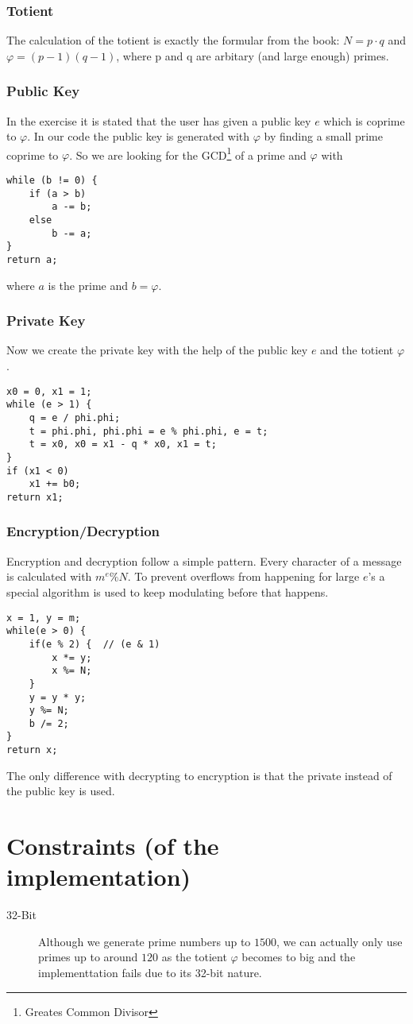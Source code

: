 \documentclass{report}
\begin{document}
\subsubsection{Totient}
The calculation of the totient is exactly the formular from the book: $N = p \cdot q$ and $\varphi = (p - 1)(q - 1)$, where p and q are arbitary (and large enough) primes.
\subsubsection{Public Key}
In the exercise it is stated that the user has given a public key $e$ which is coprime to $\varphi$. In our code the public key is generated with $\varphi$ by finding a small prime coprime to $\varphi$. So we are looking for the GCD\footnote{Greates Common Divisor} of a prime and $\varphi$ with
\begin{lstlisting}
while (b != 0) {
	if (a > b)
		a -= b;
	else
		b -= a;
}
return a;
\end{lstlisting}
where $a$ is the prime and $b=\varphi$.
\subsubsection{Private Key}
Now we create the private key with the help of the public key $e$ and the totient $\varphi$.
\begin{lstlisting}
x0 = 0, x1 = 1;
while (e > 1) {
	q = e / phi.phi;
	t = phi.phi, phi.phi = e % phi.phi, e = t;
	t = x0, x0 = x1 - q * x0, x1 = t;
}
if (x1 < 0)
	x1 += b0;
return x1;
\end{lstlisting}
\subsubsection{Encryption/Decryption}
Encryption and decryption follow a simple pattern. Every character of a message is calculated with $m^e\%N$. To prevent overflows from happening for large $e$'s a special algorithm is used to keep modulating before that happens.
\begin{lstlisting}
x = 1, y = m;
while(e > 0) {
	if(e % 2) {  // (e & 1)
		x *= y;
		x %= N;
	}
	y = y * y;
	y %= N;
	b /= 2;
}
return x;
\end{lstlisting}
The only difference with decrypting to encryption is that the private instead of the public key is used.
\section{Constraints (of the implementation)}
\begin{description}
	\item[32-Bit] Although we generate prime numbers up to $1500$, we can actually only use primes up to around $120$ as the totient $\varphi$ becomes to big and the implementtation fails due to its 32-bit nature.
\end{description}
\end{document}
